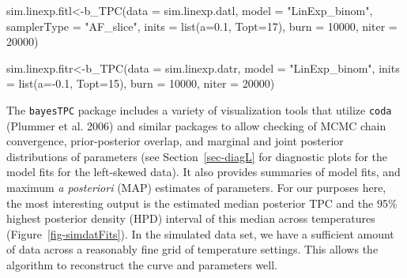 \documentclass[
  12pt,
]{article}
\newenvironment{Shaded}{\begin{snugshade}}{\end{snugshade}}
\newcommand{\AttributeTok}[1]{\textcolor[rgb]{0.40,0.45,0.13}{#1}}
\newcommand{\DecValTok}[1]{\textcolor[rgb]{0.68,0.00,0.00}{#1}}
\newcommand{\FloatTok}[1]{\textcolor[rgb]{0.68,0.00,0.00}{#1}}
\newcommand{\FunctionTok}[1]{\textcolor[rgb]{0.28,0.35,0.67}{#1}}
\newcommand{\NormalTok}[1]{\textcolor[rgb]{0.00,0.23,0.31}{#1}}
\newcommand{\OtherTok}[1]{\textcolor[rgb]{0.00,0.23,0.31}{#1}}
\newcommand{\SpecialCharTok}[1]{\textcolor[rgb]{0.37,0.37,0.37}{#1}}
\newcommand{\StringTok}[1]{\textcolor[rgb]{0.13,0.47,0.30}{#1}}
\begin{document}
\begin{Shaded}
\begin{Highlighting}[]
\NormalTok{sim.linexp.fitl}\OtherTok{\textless{}{-}}\FunctionTok{b\_TPC}\NormalTok{(}\AttributeTok{data =}\NormalTok{ sim.linexp.datl, }
                      \AttributeTok{model =} \StringTok{"LinExp\_binom"}\NormalTok{, }
                      \AttributeTok{samplerType =} \StringTok{"AF\_slice"}\NormalTok{,}
                      \AttributeTok{inits =} \FunctionTok{list}\NormalTok{(}\AttributeTok{a=}\FloatTok{0.1}\NormalTok{, }\AttributeTok{Topt=}\DecValTok{17}\NormalTok{),}
                      \AttributeTok{burn =} \DecValTok{10000}\NormalTok{,}
                      \AttributeTok{niter =} \DecValTok{20000}\NormalTok{)}

\NormalTok{sim.linexp.fitr}\OtherTok{\textless{}{-}}\FunctionTok{b\_TPC}\NormalTok{(}\AttributeTok{data =}\NormalTok{ sim.linexp.datr, }
                       \AttributeTok{model =} \StringTok{"LinExp\_binom"}\NormalTok{, }
                       \AttributeTok{inits =} \FunctionTok{list}\NormalTok{(}\AttributeTok{a=}\SpecialCharTok{{-}}\FloatTok{0.1}\NormalTok{, }\AttributeTok{Topt=}\DecValTok{15}\NormalTok{),}
                       \AttributeTok{burn =} \DecValTok{10000}\NormalTok{,}
                       \AttributeTok{niter =} \DecValTok{20000}\NormalTok{)}
\end{Highlighting}
\end{Shaded}

The \texttt{bayesTPC} package includes a variety of visualization tools
that utilize \texttt{coda} (Plummer et al. 2006) and similar packages to
allow checking of MCMC chain convergence, prior-posterior overlap, and
marginal and joint posterior distributions of parameters (see
Section~\ref{sec-diagL} for diagnostic plots for the model fits for the
left-skewed data). It also provides summaries of model fits, and maximum
\emph{a posteriori} (MAP) estimates of parameters. For our purposes
here, the most interesting output is the estimated median posterior TPC
and the 95\% highest posterior density (HPD) interval of this median
across temperatures (Figure~\ref{fig-simdatFits}). In the simulated data
set, we have a sufficient amount of data across a reasonably fine grid
of temperature settings. This allows the algorithm to reconstruct the
curve and parameters well.
\end{document}
